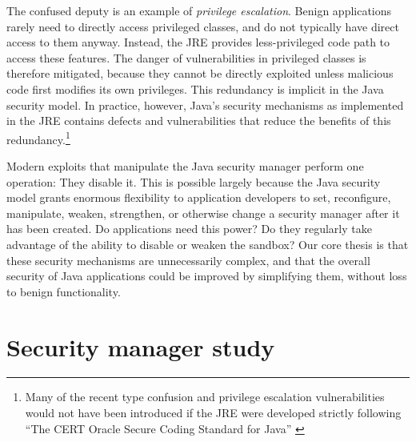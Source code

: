\documentclass{sig-alternate}
\begin{document}
The confused deputy is an example of \emph{privilege escalation}.  Benign
applications rarely need to directly access privileged classes, and do not
typically have direct access to them anyway. 
Instead, the JRE provides less-privileged code path
to access these features. The danger of vulnerabilities in privileged
classes is therefore mitigated, because they cannot be directly exploited
unless malicious code first modifies its own privileges. 
This redundancy is implicit in the Java security model. %
%
In practice, however, Java's security mechanisms as implemented
in the JRE contains defects and vulnerabilities that reduce the benefits of
this redundancy.\footnote{Many of the recent type confusion and privilege escalation vulnerabilities
would not have been introduced if the JRE were developed strictly
following ``The CERT Oracle Secure Coding Standard for Java'' \cite{long_cert_2011,svoboda_anatomy_blog_2013,svoboda_anatomy_2014}}
  
Modern exploits that manipulate the Java security manager perform one
operation: They disable it.  This is possible largely because the Java security model
grants enormous flexibility to application developers to
set, reconfigure, manipulate, weaken, strengthen, or otherwise change a security
manager after it has been created.
Do applications need this power?  Do they regularly take advantage of the
ability to disable or weaken the sandbox? %
Our core thesis is that these security mechanisms are unnecessarily
complex, and that the overall security of Java applications could be improved by
simplifying them, without loss to benign functionality.

\section{Security manager study}\label{sec:Security-Manager-Study}
\end{document}
